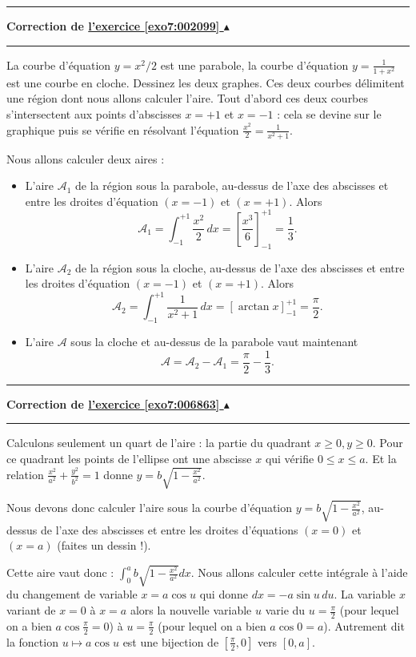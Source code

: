 \documentclass[11pt,a4paper]{article}
\renewcommand{\ge}{\geqslant} \renewcommand{\geq}{\geqslant}
\renewcommand{\le}{\leqslant} \renewcommand{\leq}{\leqslant}
\newcounter{exo}
\newcommand{\correction}[1]{\hypertarget{cor7:#1}{}\label{cor7:#1}{\bf Correction de \hyperlink{exo7:#1}{l'exercice \ref{exo7:#1} $\blacktriangle$}}\vspace{1mm}\hrule\vspace{1mm}}
\newcommand{\fincorrection}{\vspace{1mm}\hrule\vspace*{7mm}}
\begin{document}
\fincorrection
\correction{002099}
La courbe d'équation $y=x^2/2$ est une parabole, la courbe 
d'équation $y=\frac 1{1+x^2}$ est une courbe en cloche. Dessinez les deux graphes.
Ces deux courbes délimitent une région dont nous allons calculer l'aire.
Tout d'abord ces deux courbes s'intersectent
aux points d'abscisses $x=+1$ et $x=-1$ : cela se devine sur le graphique puis
se vérifie en résolvant l'équation $\frac{x^2}2=\frac 1{x^2+1}$.

Nous allons calculer deux aires :
\begin{itemize}
  \item L'aire $\mathcal{A}_1$ de la région sous la parabole, au-dessus de l'axe des abscisses et 
entre les droites d'équation $(x=-1)$ et $(x=+1)$.
Alors 
$$\mathcal{A}_1 = \int_{-1}^{+1} \frac{x^2}2 \, dx = \left[ \frac{x^3}{6} \right]_{-1}^{+1} = \frac 13.$$

  \item L'aire $\mathcal{A}_2$ de la région sous la cloche, au-dessus de l'axe des abscisses et 
entre les droites d'équation $(x=-1)$ et $(x=+1)$.
Alors 
$$\mathcal{A}_2 = \int_{-1}^{+1} \frac 1{x^2+1} \, dx = \left[ \arctan x \right]_{-1}^{+1} = \frac{\pi}{2}.$$

  \item L'aire $\mathcal{A}$ sous la cloche et au-dessus de la parabole vaut maintenant
$$\mathcal{A}= \mathcal{A}_2 - \mathcal{A}_1 = \frac{\pi}{2} - \frac 13.$$
\end{itemize}
\fincorrection
\correction{006863}
 Calculons seulement un quart de l'aire : la partie du quadrant $x\ge 0, y\ge 0$.
Pour ce quadrant les points de l'ellipse ont une abscisse $x$ qui vérifie $0 \le x \le a$.
Et la relation $\frac{x^2}{a^2}+ \frac{y^2}{b^2} = 1$ donne $y = b\sqrt{1-\frac{x^2}{a^2}}$.

\medskip

Nous devons donc calculer l'aire sous la courbe d'équation $y = b\sqrt{1-\frac{x^2}{a^2}}$,
au-dessus de l'axe des abscisses et entre les droites d'équations $(x=0)$ et $(x=a)$ (faites un dessin !).

Cette aire vaut donc : $\displaystyle \int_0^a b\sqrt{1-\frac{x^2}{a^2}} dx$.
Nous allons calculer cette intégrale à l'aide du changement de variable 
$x=a \cos u$ qui donne $dx = -a\sin u \, du$. La variable $x$ variant de 
$x=0$ à $x=a$ alors la nouvelle variable $u$ varie du $u=\frac \pi 2$ (pour lequel on a bien
$a\cos \frac\pi 2 = 0$) à $u=\frac \pi 2$ (pour lequel on a bien
$a\cos 0 = a$). Autrement dit la fonction $u \mapsto a\cos u$ est une bijection
de $[\frac\pi2,0]$ vers $[0,a]$.
\end{document}
